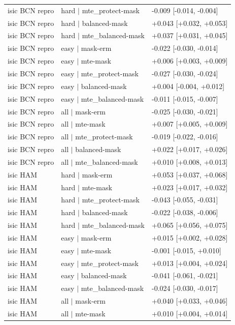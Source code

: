 \begin{table}[H]
\begin{tabular}{lll}
isic BCN repro & hard $|$ mte\_protect-mask & -0.009 [-0.014, -0.004] \\
isic BCN repro & hard $|$ balanced-mask & +0.043 [+0.032, +0.053] \\
isic BCN repro & hard $|$ mte\_balanced-mask & +0.037 [+0.031, +0.045] \\
isic BCN repro & easy $|$ mask-erm & -0.022 [-0.030, -0.014] \\
isic BCN repro & easy $|$ mte-mask & +0.006 [+0.003, +0.009] \\
isic BCN repro & easy $|$ mte\_protect-mask & -0.027 [-0.030, -0.024] \\
isic BCN repro & easy $|$ balanced-mask & +0.004 [-0.004, +0.012] \\
isic BCN repro & easy $|$ mte\_balanced-mask & -0.011 [-0.015, -0.007] \\
isic BCN repro & all $|$ mask-erm & -0.025 [-0.030, -0.021] \\
isic BCN repro & all $|$ mte-mask & +0.007 [+0.005, +0.009] \\
isic BCN repro & all $|$ mte\_protect-mask & -0.019 [-0.022, -0.016] \\
isic BCN repro & all $|$ balanced-mask & +0.022 [+0.017, +0.026] \\
isic BCN repro & all $|$ mte\_balanced-mask & +0.010 [+0.008, +0.013] \\
isic HAM & hard $|$ mask-erm & +0.053 [+0.037, +0.068] \\
isic HAM & hard $|$ mte-mask & +0.023 [+0.017, +0.032] \\
isic HAM & hard $|$ mte\_protect-mask & -0.043 [-0.055, -0.031] \\
isic HAM & hard $|$ balanced-mask & -0.022 [-0.038, -0.006] \\
isic HAM & hard $|$ mte\_balanced-mask & +0.065 [+0.056, +0.075] \\
isic HAM & easy $|$ mask-erm & +0.015 [+0.002, +0.028] \\
isic HAM & easy $|$ mte-mask & -0.001 [-0.015, +0.010] \\
isic HAM & easy $|$ mte\_protect-mask & +0.013 [+0.004, +0.024] \\
isic HAM & easy $|$ balanced-mask & -0.041 [-0.061, -0.021] \\
isic HAM & easy $|$ mte\_balanced-mask & -0.024 [-0.030, -0.017] \\
isic HAM & all $|$ mask-erm & +0.040 [+0.033, +0.046] \\
isic HAM & all $|$ mte-mask & +0.010 [+0.004, +0.014] \\

\end{tabular}
\end{table}
